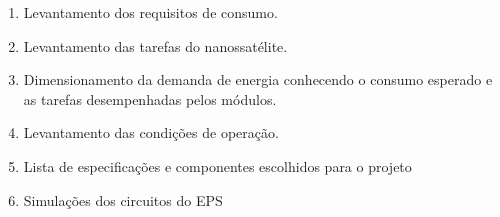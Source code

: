 \begin{enumerate}
    \item Levantamento dos requisitos de consumo.
    \item Levantamento das tarefas do nanossatélite.
    \item Dimensionamento da demanda de energia conhecendo o consumo esperado e as tarefas desempenhadas pelos módulos.
    \item Levantamento das condições de operação.
    \item Lista de especificações e componentes escolhidos para o projeto
    \item Simulações dos circuitos do EPS
\end{enumerate}


